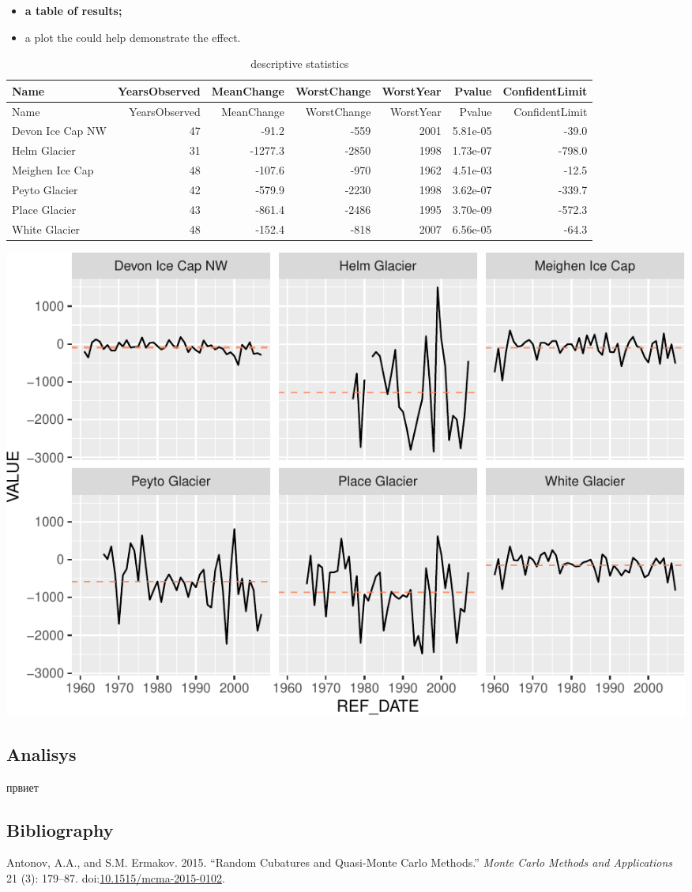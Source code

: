 \documentclass[]{article}
\providecommand{\tightlist}{%
  \setlength{\itemsep}{0pt}\setlength{\parskip}{0pt}}
\begin{document}
\begin{itemize}
\tightlist
\item
  \textbf{a table of results;}
\item
  a plot the could help demonstrate the effect.
\end{itemize}

\begin{longtable}[]{@{}lrrrrrr@{}}
\caption{descriptive statistics}\tabularnewline
\toprule
Name & YearsObserved & MeanChange & WorstChange & WorstYear & Pvalue &
ConfidentLimit\tabularnewline
\midrule
\endfirsthead
\toprule
Name & YearsObserved & MeanChange & WorstChange & WorstYear & Pvalue &
ConfidentLimit\tabularnewline
\midrule
\endhead
Devon Ice Cap NW & 47 & -91.2 & -559 & 2001 & 5.81e-05 &
-39.0\tabularnewline
Helm Glacier & 31 & -1277.3 & -2850 & 1998 & 1.73e-07 &
-798.0\tabularnewline
Meighen Ice Cap & 48 & -107.6 & -970 & 1962 & 4.51e-03 &
-12.5\tabularnewline
Peyto Glacier & 42 & -579.9 & -2230 & 1998 & 3.62e-07 &
-339.7\tabularnewline
Place Glacier & 43 & -861.4 & -2486 & 1995 & 3.70e-09 &
-572.3\tabularnewline
White Glacier & 48 & -152.4 & -818 & 2007 & 6.56e-05 &
-64.3\tabularnewline
\bottomrule
\end{longtable}

\includegraphics{R-3-Markdown_files/figure-latex/unnamed-chunk-4-1.pdf}

\subsection{Analisys}\label{analisys}

 првиет

\subsection*{Bibliography}\label{bibliography}

\hypertarget{refs}{}
\hypertarget{ref-AntonovErmakov_RandomCubaturesQMC}{}
Antonov, A.A., and S.M. Ermakov. 2015. ``Random Cubatures and
Quasi-Monte Carlo Methods.'' \emph{Monte Carlo Methods and Applications}
21 (3): 179--87.
doi:\href{https://doi.org/10.1515/mcma-2015-0102}{10.1515/mcma-2015-0102}.
\end{document}
